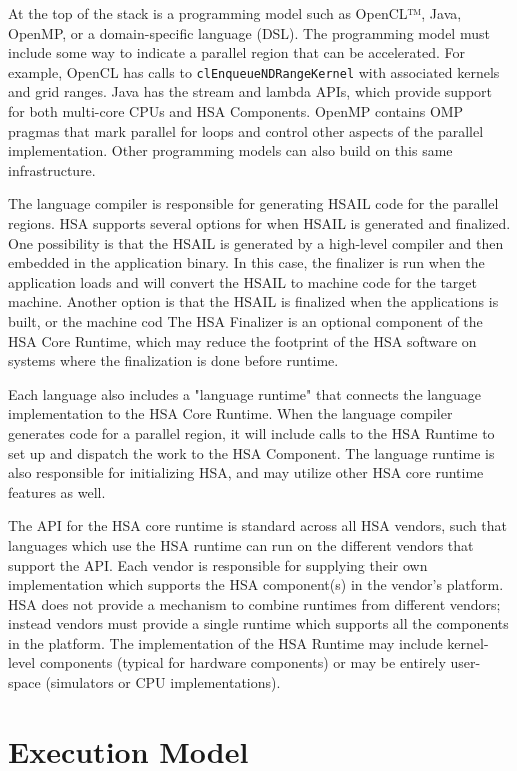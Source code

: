 \documentclass[draft]{book}
\begin{document}
At the top of the stack is a programming model such as OpenCL™, Java, OpenMP, or
a domain-specific language (DSL). The programming model must include some way
to indicate a parallel region that can be accelerated. For example, OpenCL has
calls to \texttt{clEnqueueNDRangeKernel} with associated kernels and grid
ranges. Java has the stream and lambda APIs, which provide support for both
multi-core CPUs and HSA Components. OpenMP contains OMP pragmas that mark
parallel for loops and control other aspects of the parallel implementation.
Other programming models can also build on this same infrastructure.

The language compiler is responsible for generating HSAIL code for the parallel
regions. HSA supports several options for when HSAIL is generated and
finalized. One possibility is that the HSAIL is generated by a high-level
compiler and then embedded in the application binary. In this case, the
finalizer is run when the application loads and will convert the HSAIL to
machine code for the target machine. Another option is that the HSAIL is
finalized when the applications is built, or the machine cod The HSA Finalizer
is an optional component of the HSA Core Runtime, which may reduce the footprint
of the HSA software on systems where the finalization is done before runtime.

Each language also includes a "language runtime" that connects the language
implementation to the HSA Core Runtime. When the language compiler generates
code for a parallel region, it will include calls to the HSA Runtime to set up
and dispatch the work to the HSA Component. The language runtime is also
responsible for initializing HSA, and may utilize other HSA core runtime
features as well.

The API for the HSA core runtime is standard across all HSA vendors, such that
languages which use the HSA runtime can run on the different vendors that
support the API. Each vendor is responsible for supplying their own
implementation which supports the HSA component(s) in the vendor's platform. HSA
does not provide a mechanism to combine runtimes from different vendors; instead
vendors must provide a single runtime which supports all the components in the
platform. The implementation of the HSA Runtime may include kernel-level
components (typical for hardware components) or may be entirely user-space
(simulators or CPU implementations).

\hypertarget{executionmodel}{}\section{Execution
Model}\label{executionmodel}
\end{document}
